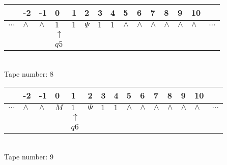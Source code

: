 \documentclass{article}
\begin{document}
\begin{table}[H]
\centering
\begin{tabular}{lllllllllllllll}
 & -2 & -1 & 0 & 1 & 2 & 3 & 4 & 5 & 6 & 7 & 8 & 9 & 10 & \\
\hline
$...$ & \multicolumn{1}{|l|}{$\wedge$} & \multicolumn{1}{|l|}{$\wedge$} & \multicolumn{1}{|l|}{$1$} & \multicolumn{1}{|l|}{$1$} & \multicolumn{1}{|l|}{$\Psi$} & \multicolumn{1}{|l|}{$1$} & \multicolumn{1}{|l|}{$1$} & \multicolumn{1}{|l|}{$\wedge$} & \multicolumn{1}{|l|}{$\wedge$} & \multicolumn{1}{|l|}{$\wedge$} & \multicolumn{1}{|l|}{$\wedge$} & \multicolumn{1}{|l|}{$\wedge$} & \multicolumn{1}{|l|}{$\wedge$} & $...$\\
\hline
&  &  & $\uparrow$ &  &  &  &  &  &  &  &  &  &  &  \\
&  &  & $ q5 $ &  &  &  &  &  &  &  &  &  &  &  \\
\end{tabular}
\\
Tape number: 8
\noindent\makebox[\linewidth]{\hdashrule{\textwidth}{1pt}{1pt}}\end{table}

\begin{table}[H]
\centering
\begin{tabular}{lllllllllllllll}
 & -2 & -1 & 0 & 1 & 2 & 3 & 4 & 5 & 6 & 7 & 8 & 9 & 10 & \\
\hline
$...$ & \multicolumn{1}{|l|}{$\wedge$} & \multicolumn{1}{|l|}{$\wedge$} & \multicolumn{1}{|l|}{$M$} & \multicolumn{1}{|l|}{$1$} & \multicolumn{1}{|l|}{$\Psi$} & \multicolumn{1}{|l|}{$1$} & \multicolumn{1}{|l|}{$1$} & \multicolumn{1}{|l|}{$\wedge$} & \multicolumn{1}{|l|}{$\wedge$} & \multicolumn{1}{|l|}{$\wedge$} & \multicolumn{1}{|l|}{$\wedge$} & \multicolumn{1}{|l|}{$\wedge$} & \multicolumn{1}{|l|}{$\wedge$} & $...$\\
\hline
&  &  &  & $\uparrow$ &  &  &  &  &  &  &  &  &  &  \\
&  &  &  & $ q6 $ &  &  &  &  &  &  &  &  &  &  \\
\end{tabular}
\\
Tape number: 9
\noindent\makebox[\linewidth]{\hdashrule{\textwidth}{1pt}{1pt}}\end{table}
\end{document}
